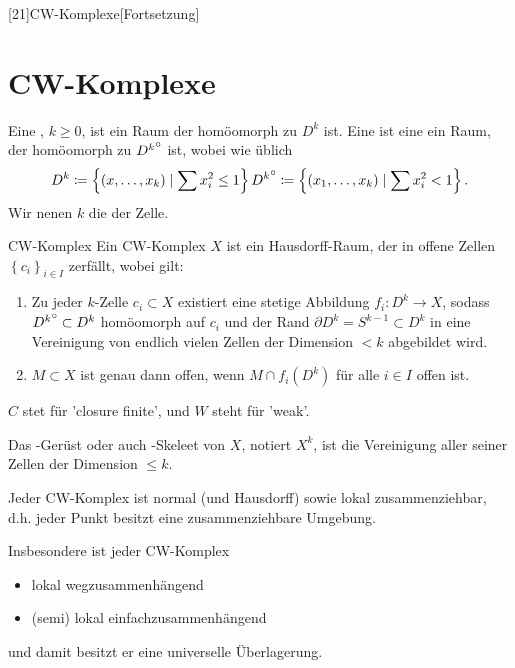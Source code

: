 [21]{CW-Komplexe}[Fortsetzung]

\section{CW-Komplexe}\label{sec:cw-komplexe}
\begin{definition}[$k$-Zelle]\label{def:k-zelle}
    Eine ,  $k\geq 0$, ist ein Raum der homöomorph zu $D^k$ ist. Eine  ist eine ein Raum, der homöomorph zu ${D^k}^\circ$  ist, wobei wie üblich
    \[
        D^k \coloneqq  \left \{(x,\ldots,x_k) \mid  \sum x_i ^2 \leq  1\right\} \\
        {D^k}^\circ \coloneqq  \left \{(x_1,\ldots,x_k) \mid  \sum x_i^2 < 1\right\} 
    .\] 
    Wir nenen $k$ die   der Zelle. 
\end{definition}

\begin{definition}{CW-Komplex}\label{def:cw-komplex}
    Ein CW-Komplex  $X$ ist ein Hausdorff-Raum, der in offene Zellen  $\left \{c_i\right\} _{i \in I}$ zerfällt, wobei gilt:
    \begin{enumerate}[1.]
        \item Zu jeder $k$-Zelle  $c_i \subset X$ existiert eine stetige Abbildung $f_i \colon  D^k \to  X$, sodass ${D^k}^\circ \subset D^k$ homöomorph auf $c_i$ und der Rand  $\partial D^k = S^{k-1} \subset D^k$ in eine Vereinigung von endlich vielen Zellen der Dimension $<k$ abgebildet wird. 
        \item $M\subset X$ ist genau dann offen, wenn $M \cap f_i(D^k)$ für alle $i\in I$ offen ist.
    \end{enumerate}
\end{definition}

\begin{oral}
    $C$ stet für 'closure finite', und  $W$ steht für 'weak'.
\end{oral}

\begin{dnotation}
    Das -Gerüst oder auch -Skeleet von $X$, notiert  $X^k$, ist die Vereinigung aller seiner Zellen der Dimension  $\leq k$.  
\end{dnotation}

\begin{remark}
    Jeder CW-Komplex ist normal (und Hausdorff) sowie lokal zusammenziehbar, d.h. jeder Punkt besitzt eine zusammenziehbare Umgebung.

    Insbesondere ist jeder CW-Komplex
    \begin{itemize}
        \item lokal wegzusammenhängend
        \item (semi) lokal einfachzusammenhängend
    \end{itemize}
    und damit besitzt er eine universelle Überlagerung.
\end{remark}


